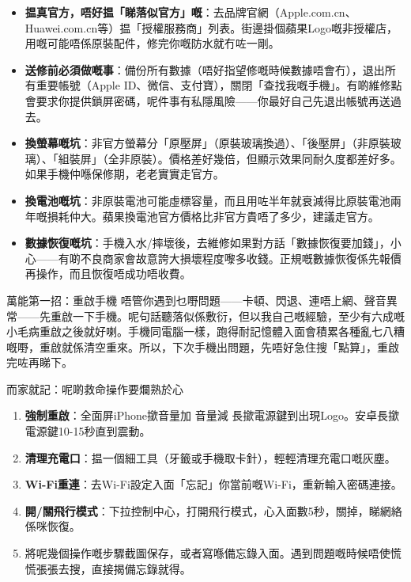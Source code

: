 \begin{itemize}
  \item \textbf{揾真官方，唔好揾「睇落似官方」嘅}：去品牌官網（Apple.com.cn、Huawei.com.cn等）揾「授權服務商」列表。街邊掛個蘋果Logo嘅非授權店，用嘅可能唔係原裝配件，修完你嘅防水就冇咗一剛。
  \item \textbf{送修前必須做嘅事}：備份所有數據（唔好指望修嘅時候數據唔會冇），退出所有重要帳號（Apple ID、微信、支付寶），關閉「查找我嘅手機」。有啲維修點會要求你提供鎖屏密碼，呢件事有私隱風險——你最好自己先退出帳號再送過去。
  \item \textbf{換螢幕嘅坑}：非官方螢幕分「原壓屏」（原裝玻璃換過）、「後壓屏」（非原裝玻璃）、「組裝屏」（全非原裝）。價格差好幾倍，但顯示效果同耐久度都差好多。如果手機仲喺保修期，老老實實走官方。
  \item \textbf{換電池嘅坑}：非原裝電池可能虛標容量，而且用咗半年就衰減得比原裝電池兩年嘅損耗仲大。蘋果換電池官方價格比非官方貴唔了多少，建議走官方。
  \item \textbf{數據恢復嘅坑}：手機入水/摔壞後，去維修如果對方話「數據恢復要加錢」，小心——有啲不良商家會故意誇大損壞程度嚟多收錢。正規嘅數據恢復係先報價再操作，而且恢復唔成功唔收費。
\end{itemize}

\begin{tcbwarn}{萬能第一招：重啟手機}
唔管你遇到乜嘢問題——卡頓、閃退、連唔上網、聲音異常——先重啟一下手機。呢句話聽落似係敷衍，但以我自己嘅經驗，至少有六成嘅小毛病重啟之後就好喇。手機同電腦一樣，跑得耐記憶體入面會積累各種亂七八糟嘅嘢，重啟就係清空重來。所以，下次手機出問題，先唔好急住搜「點算」，重啟完咗再睇下。

\end{tcbwarn}

\begin{tcbpractice}{而家就記：呢啲救命操作要爛熟於心}
\begin{enumerate}
  \item \textbf{強制重啟}：全面屏iPhone撳音量加 音量減 長撳電源鍵到出現Logo。安卓長撳電源鍵10-15秒直到震動。
  \item \textbf{清理充電口}：揾一個細工具（牙籤或手機取卡針），輕輕清理充電口嘅灰塵。
  \item \textbf{Wi-Fi重連}：去Wi-Fi設定入面「忘記」你當前嘅Wi-Fi，重新輸入密碼連接。
  \item \textbf{開/關飛行模式}：下拉控制中心，打開飛行模式，心入面數5秒，關掉，睇網絡係咪恢復。
  \item 將呢幾個操作嘅步驟截圖保存，或者寫喺備忘錄入面。遇到問題嘅時候唔使慌慌張張去搜，直接揭備忘錄就得。
\end{enumerate}

\end{tcbpractice}
